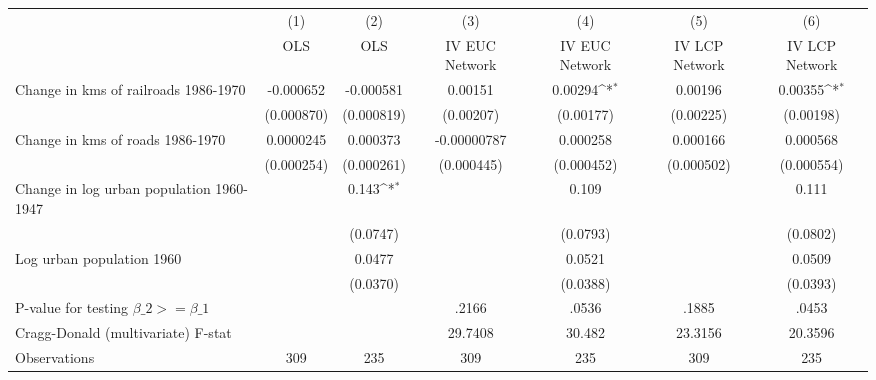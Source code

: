 {
\def\sym#1{\ifmmode^{#1}\else\(^{#1}\)\fi}
\begin{tabular}{l*{6}{c}}
\hline\hline
                &\multicolumn{1}{c}{(1)}&\multicolumn{1}{c}{(2)}&\multicolumn{1}{c}{(3)}&\multicolumn{1}{c}{(4)}&\multicolumn{1}{c}{(5)}&\multicolumn{1}{c}{(6)}\\
                &\multicolumn{1}{c}{OLS}&\multicolumn{1}{c}{OLS}&\multicolumn{1}{c}{IV EUC Network}&\multicolumn{1}{c}{IV EUC Network}&\multicolumn{1}{c}{IV LCP Network}&\multicolumn{1}{c}{IV LCP Network}\\
\hline
Change in kms of railroads 1986-1970&-0.000652         &-0.000581         &  0.00151         &  0.00294\sym{*}  &  0.00196         &  0.00355\sym{*}  \\
                &(0.000870)         &(0.000819)         &(0.00207)         &(0.00177)         &(0.00225)         &(0.00198)         \\
[1em]
Change in kms of roads 1986-1970&0.0000245         & 0.000373         &-0.00000787         & 0.000258         & 0.000166         & 0.000568         \\
                &(0.000254)         &(0.000261)         &(0.000445)         &(0.000452)         &(0.000502)         &(0.000554)         \\
[1em]
Change in log urban population 1960-1947&                  &    0.143\sym{*}  &                  &    0.109         &                  &    0.111         \\
                &                  & (0.0747)         &                  & (0.0793)         &                  & (0.0802)         \\
[1em]
Log urban population 1960&                  &   0.0477         &                  &   0.0521         &                  &   0.0509         \\
                &                  & (0.0370)         &                  & (0.0388)         &                  & (0.0393)         \\
\hline
P-value for testing $\beta\_{2} >= \beta\_{1}$&                  &                  &    .2166         &    .0536         &    .1885         &    .0453         \\
Cragg-Donald (multivariate) F-stat&                  &                  &  29.7408         &   30.482         &  23.3156         &  20.3596         \\
Observations    &      309         &      235         &      309         &      235         &      309         &      235         \\
\hline\hline
\end{tabular}
}
